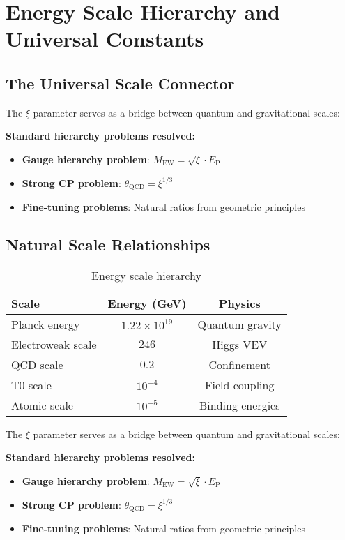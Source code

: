 \documentclass[12pt,a4paper]{report}
\newcommand{\EP}{E_{\text{P}}}            %
\begin{document}
	\section{Energy Scale Hierarchy and Universal Constants}
	\label{sec:energy_scale_hierarchy}
	
	\subsection{The Universal Scale Connector}
	\label{subsec:universal_scale_connector}
	
	The $\xi$ parameter serves as a bridge between quantum and gravitational scales:
	
	\textbf{Standard hierarchy problems resolved:}
	\begin{itemize}
		\item \textbf{Gauge hierarchy problem}: $M_{\text{EW}} = \sqrt{\xi} \cdot \EP$
		\item \textbf{Strong CP problem}: $\theta_{\text{QCD}} = \xi^{1/3}$
		\item \textbf{Fine-tuning problems}: Natural ratios from geometric principles
	\end{itemize}
	
	\subsection{Natural Scale Relationships}
	\label{subsec:natural_scale_relationships}
	
	\begin{table}[htbp]
		\centering
		\begin{tabular}{lcc}
			\toprule
			\textbf{Scale} & \textbf{Energy (GeV)} & \textbf{Physics} \\
			\midrule
			Planck energy & $1.22 \times 10^{19}$ & Quantum gravity \\
			Electroweak scale & $246$ & Higgs VEV \\
			QCD scale & $0.2$ & Confinement \\
			T0 scale & $10^{-4}$ & Field coupling \\
			Atomic scale & $10^{-5}$ & Binding energies \\
			\bottomrule
		\end{tabular}
		\caption{Energy scale hierarchy}
		\label{tab:energy_scales_no_xi}
	\end{table}
The $\xi$ parameter serves as a bridge between quantum and gravitational scales:

\textbf{Standard hierarchy problems resolved:}
\begin{itemize}
	\item \textbf{Gauge hierarchy problem}: $M_{\text{EW}} = \sqrt{\xi} \cdot \EP$
	\item \textbf{Strong CP problem}: $\theta_{\text{QCD}} = \xi^{1/3}$
	\item \textbf{Fine-tuning problems}: Natural ratios from geometric principles
\end{itemize}
\end{document}
